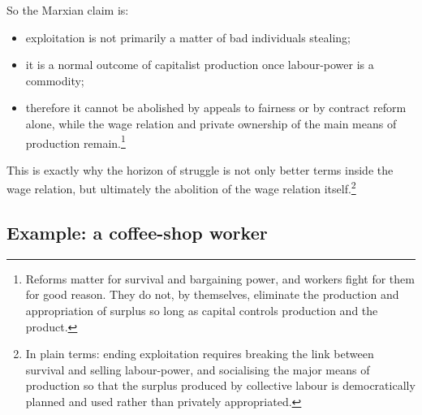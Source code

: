 So the Marxian claim is:

\begin{itemize}[leftmargin=1.5em]
  \item exploitation is not primarily a matter of bad individuals stealing;
  \item it is a normal outcome of capitalist production once labour-power is a commodity;
  \item therefore it cannot be abolished by appeals to fairness or by contract reform alone, while the wage relation and private ownership of the main means of production remain.\footnote{Reforms matter for survival and bargaining power, and workers fight for them for good reason. They do not, by themselves, eliminate the production and appropriation of surplus so long as capital controls production and the product.}
\end{itemize}

This is exactly why the horizon of struggle is not only better terms inside the wage
relation, but ultimately the abolition of the wage relation itself.\footnote{In plain terms: ending exploitation requires breaking the link between survival and selling labour-power, and socialising the major means of production so that the surplus produced by collective labour is democratically planned and used rather than privately appropriated.}


\subsection{Example: a coffee-shop worker}

